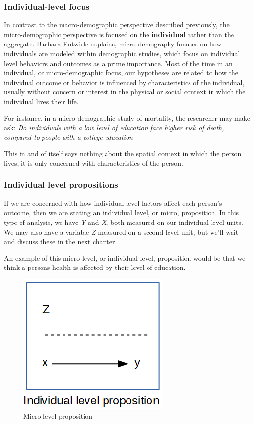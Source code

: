 \documentclass[
]{article}
\begin{document}
\hypertarget{individual-level-focus}{%
\subsubsection{Individual-level focus}\label{individual-level-focus}}

In contrast to the macro-demographic perspective described previously, the micro-demographic perspective is focused on the \textbf{individual} rather than the aggregate. Barbara Entwisle \citeyearpar{Entwisle2007a} explains, micro-demography focuses on how individuals are modeled within demographic studies, which focus on individual level behaviors and outcomes as a prime importance. Most of the time in an individual, or micro-demographic focus, our hypotheses are related to how the individual outcome or behavior is influenced by characteristics of the individual, usually without concern or interest in the physical or social context in which the individual lives their life.

For instance, in a micro-demographic study of mortality, the researcher may make ask:
\emph{Do individuals with a low level of education face higher risk of death, compared to people with a college education}

This in and of itself says nothing about the spatial context in which the person lives, it is only concerned with characteristics of the person.

\hypertarget{individual-level-propositions}{%
\subsubsection{Individual level propositions}\label{individual-level-propositions}}

If we are concerned with how individual-level factors affect each person's outcome, then we are stating an individual level, or micro, proposition. In this type of analysis, we have \emph{Y} and \emph{X}, both measured on our individual level units. We may also have a variable \emph{Z} measured on a second-level unit, but we'll wait and discuss these in the next chapter.

An example of this micro-level, or individual level, proposition would be that we think a persons health is affected by their level of education.

\begin{figure}
\centering
\includegraphics{./images/indi.png}
\caption{Micro-level proposition}
\end{figure}
\end{document}
